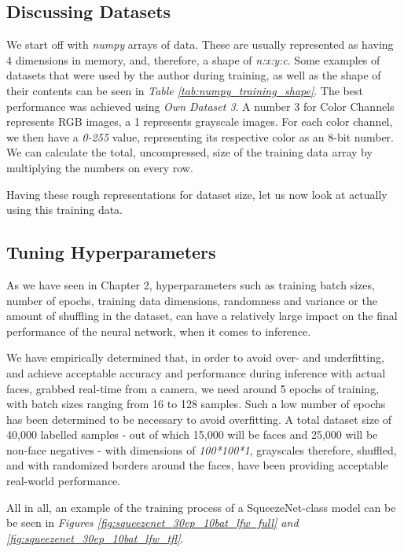 \subsection{Discussing Datasets}
We start off with \textit{numpy} arrays of data. These are usually represented as having 4 dimensions in memory, and, therefore, a shape of \textit{n:x:y:c}. Some examples of datasets that were used by the author during training, as well as the shape of their contents can be seen in \textit{Table \ref{tab:numpy_training_shape}}. The best performance was achieved using \textit{Own Dataset 3}. A number 3 for Color Channels represents RGB images, a 1 represents grayscale images. For each color channel, we then have a \textit{0-255} value, representing its respective color as an 8-bit number. We can calculate the total, uncompressed, size of the training data array by multiplying the numbers on every row. \par
Having these rough representations for dataset size, let us now look at actually using this training data.


\subsection{Tuning Hyperparameters}
As we have seen in Chapter 2, hyperparameters such as training batch sizes, number of epochs, training data dimensions, randomness and variance or the amount of shuffling in the dataset, can have a relatively large impact on the final performance of the neural network, when it comes to inference. \par
We have empirically determined that, in order to avoid over- and underfitting, and achieve acceptable accuracy and performance during inference with actual faces, grabbed real-time from a camera, we need around 5 epochs of training, with batch sizes ranging from 16 to 128 samples. Such a low number of epochs has been determined to be necessary to avoid overfitting. A total dataset size of 40,000 labelled samples - out of which 15,000 will be faces and 25,000 will be non-face negatives - with dimensions of \textit{100*100*1}, grayscales therefore, shuffled, and with randomized borders around the faces, have been providing acceptable real-world performance. \par
All in all, an example of the training process of a SqueezeNet-class model can be be seen in \textit{Figures \ref{fig:squeezenet_30ep_10bat_lfw_full} and \ref{fig:squeezenet_30ep_10bat_lfw_tfl}}.


